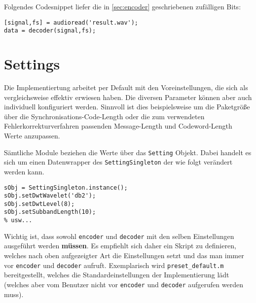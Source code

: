 Folgendes Codesnippet liefer die in \ref{sec:encoder} geschriebenen zufälligen Bits:

\begin{verbatim}
[signal,fs] = audioread('result.wav');
data = decoder(signal,fs);
\end{verbatim}


\section*{Settings}

Die Implementiertung arbeitet per Default mit den Voreinstellungen, die sich als vergleichsweise effektiv erwiesen haben. Die diversen Parameter können aber auch individuell konfiguriert werden. Sinnvoll ist dies beispielsweise um die Paketgröße über die Synchronisations-Code-Length oder die zum verwendeten Fehlerkorrekturverfahren passenden Message-Length und Codeword-Length Werte anzupassen.

Sämtliche Module beziehen die Werte über das \texttt{Setting} Objekt. Dabei handelt es sich um einen Datenwrapper des \texttt{SettingSingleton} der wie folgt verändert werden kann. 

\begin{verbatim}
sObj = SettingSingleton.instance();
sObj.setDwtWavelet('db2');
sObj.setDwtLevel(8);
sObj.setSubbandLength(10);
% usw...
\end{verbatim}

Wichtig ist, dass sowohl \texttt{encoder} und \texttt{decoder} mit den selben Einstellungen ausgeführt werden \textbf{müssen}. Es empfiehlt sich daher ein Skript zu definieren, welches nach oben aufgezeigter Art die Einstellungen setzt und das man immer vor \texttt{encoder} und \texttt{decoder} aufruft. Exemplarisch wird \texttt{preset\_default.m} bereitgestellt, welches die Standardeinstellungen der Implementierung lädt (welches aber vom Benutzer nicht vor \texttt{encoder} und \texttt{decoder} aufgerufen werden muss).









